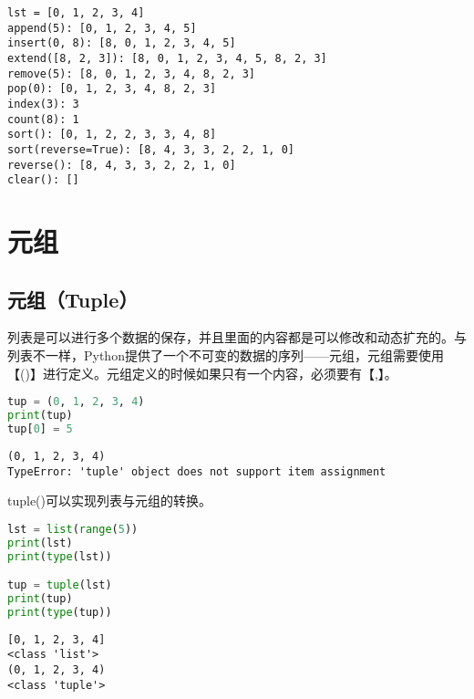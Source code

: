 \begin{tcolorbox}
	\begin{verbatim}
lst = [0, 1, 2, 3, 4]
append(5): [0, 1, 2, 3, 4, 5]
insert(0, 8): [8, 0, 1, 2, 3, 4, 5]
extend([8, 2, 3]): [8, 0, 1, 2, 3, 4, 5, 8, 2, 3]
remove(5): [8, 0, 1, 2, 3, 4, 8, 2, 3]
pop(0): [0, 1, 2, 3, 4, 8, 2, 3]
index(3): 3
count(8): 1
sort(): [0, 1, 2, 2, 3, 3, 4, 8]
sort(reverse=True): [8, 4, 3, 3, 2, 2, 1, 0]
reverse(): [8, 4, 3, 3, 2, 2, 1, 0]
clear(): []
\end{verbatim}
\end{tcolorbox}

\newpage

\section{元组}

\subsection{元组（Tuple）}

列表是可以进行多个数据的保存，并且里面的内容都是可以修改和动态扩充的。与列表不一样，Python提供了一个不可变的数据的序列——元组，元组需要使用【()】进行定义。元组定义的时候如果只有一个内容，必须要有【,】。\\


\begin{lstlisting}[language=Python]
tup = (0, 1, 2, 3, 4)
print(tup)
tup[0] = 5
\end{lstlisting}

\begin{tcolorbox}
	\begin{verbatim}
(0, 1, 2, 3, 4)
TypeError: 'tuple' object does not support item assignment
\end{verbatim}
\end{tcolorbox}

tuple()可以实现列表与元组的转换。\\


\begin{lstlisting}[language=Python]
lst = list(range(5))
print(lst)
print(type(lst))

tup = tuple(lst)
print(tup)
print(type(tup))
\end{lstlisting}

\begin{tcolorbox}
	\begin{verbatim}
[0, 1, 2, 3, 4]
<class 'list'>
(0, 1, 2, 3, 4)
<class 'tuple'>
\end{verbatim}
\end{tcolorbox}

